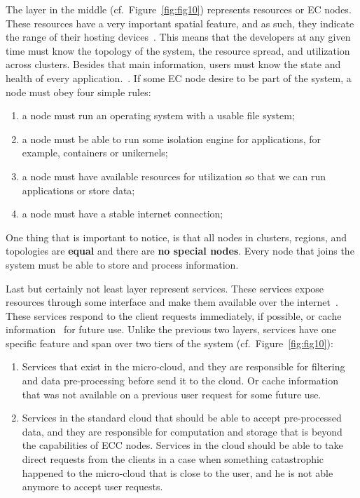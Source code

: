 The layer in the middle (cf.~Figure~\ref{fig:fig10}) represents resources or EC nodes. These resources have a very important spatial feature, and as such, they indicate the range of their hosting devices~\cite{JinCJL14}. This means that the developers at any given time must know the topology of the system, the resource spread, and utilization across clusters. Besides that main information, users must know the state and health of every application.~\label{soc:resources}. If some EC node desire to be part of the system, a node must obey four simple rules:

\begin{enumerate}[start=1,label={(\bfseries \arabic*)}]
\item a node must run an operating system with a usable file system;
\item a node must be able to run some isolation engine for applications, for example, containers or unikernels;
\item a node must have available resources for utilization so that we can run  applications or store data;
\item a node must have a stable internet connection;
\end{enumerate}

\noindent
One thing that is important to notice, is that all nodes in clusters, regions, and topologies are \textbf{equal} and there are \textbf{no special nodes}. Every node that joins the system must be able to store and process information.

Last but certainly not least layer represent services. These services expose resources through some interface and make them available over the internet~\cite{JinCJL14}. These services respond to the client requests immediately, if possible, or cache information~\cite{SatyanarayananBCD09,YaoXWYZP20} for future use. Unlike the previous two layers, services have one specific feature and span over two tiers of the system (cf.~Figure~\ref{fig:fig10}):

\begin{enumerate}[start=1,label={(\bfseries \roman*)}]\label{services}
	\item Services that exist in the micro-cloud, and they are responsible for filtering and data pre-processing before send it to the cloud. Or cache information that was not available on a previous user request for some future use.
	\item Services in the standard cloud that should be able to accept pre-processed data, and they are responsible for computation and storage that is beyond the capabilities of ECC nodes. Services in the cloud should be able to take direct requests from the clients in a case when something catastrophic happened to the micro-cloud that is close to the user, and he is not able anymore to accept user requests.
\end{enumerate}

